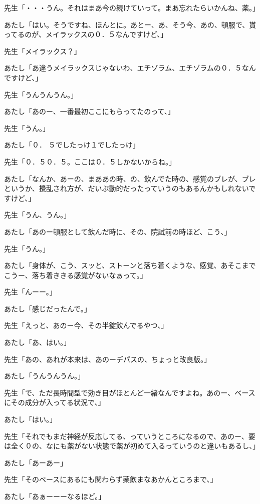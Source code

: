 \documentclass[b5j,twoside,twocolumn]{utarticle}
\begin{document}
\begin{description}
\item 先生「・・・うん。それはまあ今の続けていって。まあ忘れたらいかんね、薬。」
\item あたし「はい。そうですね、ほんとに。あとー、あ、そう今、あの、頓服で、貰ってるのが、メイラックスの０．５なんですけど、」
\item 先生「メイラックス？」
\item あたし「あ違うメイラックスじゃないわ、エチゾラム、エチゾラムの０．５なんですけど、」
\item 先生「うんうんうん。」
\item あたし「あのー、一番最初ここにもらってたのって、」
\item 先生「うん。」
\item あたし「０．	５でしたっけ１でしたっけ」
\item 先生「０．５０．５。ここは０．５しかないからね。」
\item あたし「なんか、あーの、まああの時、の、飲んでた時の、感覚のブレが、ブレというか、攪乱され方が、だいぶ動的だったっていうのもあるんかもしれないですけど、」
\item 先生「うん、うん。」
\item あたし「あのー頓服として飲んだ時に、その、院試前の時ほど、こう、」
\item 先生「うん。」
\item あたし「身体が、こう、スッと、ストーンと落ち着くような、感覚、あそこまでこうー、落ち着ききる感覚がないなぁって。」
\item 先生「んーー。」
\item あたし「感じだったんで。」
\item 先生「えっと、あのー今、その半錠飲んでるやつ、」
\item あたし「あ、はい。」
\item 先生「あの、あれが本来は、あのーデパスの、ちょっと改良版。」
\item あたし「うんうんうん。」
\item 先生「で、ただ長時間型で効き目がほとんど一緒なんですよね。あのー、ベースにその成分が入ってる状況で、」
\item あたし「はい。」
\item 先生「それでもまだ神経が反応してる、っていうところになるので、あのー、要は全く０の、なにも薬がない状態で薬が初めて入るっていうのと違いもあるし、」
\item あたし「あーあー」
\item 先生「そのベースにあるにも関わらず薬飲まなあかんところまで、」
\item あたし「あぁーーーなるほど。」

\end{description}
\end{document}
